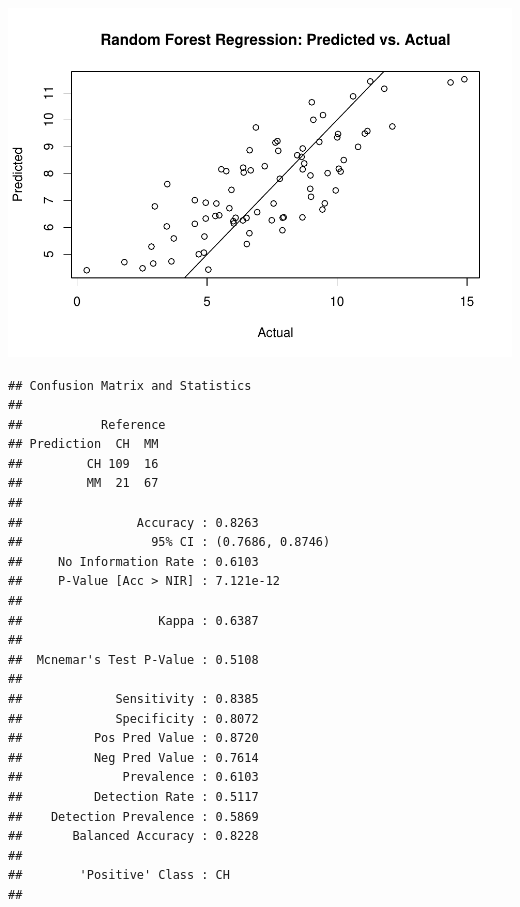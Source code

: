 \documentclass[
]{book}
\newenvironment{Shaded}{\begin{snugshade}}{\end{snugshade}}
\newcommand{\DataTypeTok}[1]{\textcolor[rgb]{0.13,0.29,0.53}{#1}}
\newcommand{\KeywordTok}[1]{\textcolor[rgb]{0.13,0.29,0.53}{\textbf{#1}}}
\newcommand{\NormalTok}[1]{#1}
\newcommand{\OperatorTok}[1]{\textcolor[rgb]{0.81,0.36,0.00}{\textbf{#1}}}
\newcommand{\StringTok}[1]{\textcolor[rgb]{0.31,0.60,0.02}{#1}}
\begin{document}
\includegraphics{data-sci_files/figure-latex/unnamed-chunk-84-2.pdf}

\begin{Shaded}
\end{Shaded}

\begin{verbatim}
## Confusion Matrix and Statistics
## 
##           Reference
## Prediction  CH  MM
##         CH 109  16
##         MM  21  67
##                                           
##                Accuracy : 0.8263          
##                  95% CI : (0.7686, 0.8746)
##     No Information Rate : 0.6103          
##     P-Value [Acc > NIR] : 7.121e-12       
##                                           
##                   Kappa : 0.6387          
##                                           
##  Mcnemar's Test P-Value : 0.5108          
##                                           
##             Sensitivity : 0.8385          
##             Specificity : 0.8072          
##          Pos Pred Value : 0.8720          
##          Neg Pred Value : 0.7614          
##              Prevalence : 0.6103          
##          Detection Rate : 0.5117          
##    Detection Prevalence : 0.5869          
##       Balanced Accuracy : 0.8228          
##                                           
##        'Positive' Class : CH              
## 
\end{verbatim}
\end{document}
